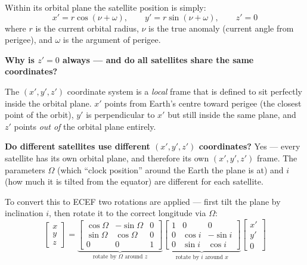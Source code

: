 \documentclass[12pt, a4paper]{article}
\begin{document}
Within its orbital plane the satellite position is simply:
\[
  x' = r\cos(\nu+\omega), \qquad y' = r\sin(\nu+\omega), \qquad z' = 0
\]
where $r$ is the current orbital radius, $\nu$ is the true anomaly
(current angle from perigee), and $\omega$ is the argument of perigee.

\begin{notebox}
  \textbf{Why is $z' = 0$ always --- and do all satellites share the same
  coordinates?}

  The $(x', y', z')$ coordinate system is a \emph{local} frame that is
  defined to sit perfectly inside the orbital plane.
  $x'$ points from Earth's centre toward perigee (the closest point of
  the orbit), $y'$ is perpendicular to $x'$ but still inside the same
  plane, and $z'$ points \emph{out of} the orbital plane entirely.

  \textbf{Do different satellites use different $(x', y', z')$
  coordinates?}
  Yes --- every satellite has its own orbital plane, and therefore its
  own $(x', y', z')$ frame.
  The parameters $\Omega$ (which ``clock position'' around the Earth
  the plane is at) and $i$ (how much it is tilted from the equator) are
  different for each satellite.
\end{notebox}

To convert this to ECEF two rotations are applied --- first tilt the
plane by inclination $i$, then rotate it to the correct longitude via
$\Omega$:
\[
  \begin{bmatrix} x \\ y \\ z \end{bmatrix}
  =
  \underbrace{
  \begin{bmatrix}
    \cos\Omega & -\sin\Omega & 0 \\
    \sin\Omega &  \cos\Omega & 0 \\
    0          &  0          & 1
  \end{bmatrix}
  }_{\text{rotate by }\Omega\text{ around }z}
  \underbrace{
  \begin{bmatrix}
    1 & 0      & 0       \\
    0 & \cos i & -\sin i \\
    0 & \sin i &  \cos i
  \end{bmatrix}
  }_{\text{rotate by }i\text{ around }x}
  \begin{bmatrix} x' \\ y' \\ 0 \end{bmatrix}
\]
\end{document}
